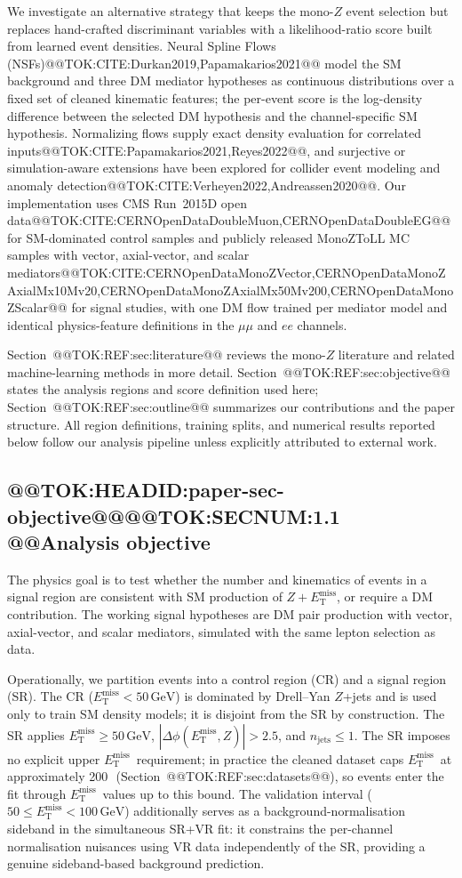 \documentclass[11pt]{article}
\newcommand{\GeV}{\text{GeV}}
\newcommand{\MET}{\ensuremath{E_{\mathrm{T}}^{\mathrm{miss}}}}
\begin{document}
We investigate an alternative strategy that keeps the mono-$Z$ event selection but replaces
hand-crafted discriminant variables with a likelihood-ratio score built from learned event
densities.
Neural Spline Flows (NSFs)@@TOK:CITE:Durkan2019,Papamakarios2021@@ model the SM background and
three DM mediator hypotheses as continuous distributions over a fixed set of cleaned
kinematic features; the per-event score is the log-density difference between the selected
DM hypothesis and the channel-specific SM hypothesis.
Normalizing flows supply exact density evaluation for correlated inputs@@TOK:CITE:Papamakarios2021,Reyes2022@@,
and surjective or simulation-aware extensions have been explored for collider event
modeling and anomaly detection@@TOK:CITE:Verheyen2022,Andreassen2020@@.
Our implementation uses CMS Run~2015D open data@@TOK:CITE:CERNOpenDataDoubleMuon,CERNOpenDataDoubleEG@@
for SM-dominated control samples and publicly released MonoZToLL MC samples with
vector, axial-vector, and scalar mediators@@TOK:CITE:CERNOpenDataMonoZVector,CERNOpenDataMonoZAxialMx10Mv20,CERNOpenDataMonoZAxialMx50Mv200,CERNOpenDataMonoZScalar@@
for signal studies, with one DM flow trained per mediator model and identical
physics-feature definitions in the $\mu\mu$ and $ee$ channels.

Section~@@TOK:REF:sec:literature@@ reviews the mono-$Z$ literature and related machine-learning
methods in more detail.
Section~@@TOK:REF:sec:objective@@ states the analysis regions and score definition used here;
Section~@@TOK:REF:sec:outline@@ summarizes our contributions and the paper structure.
All region definitions, training splits, and numerical results reported below follow our
analysis pipeline unless explicitly attributed to external work.

\subsection{@@TOK:HEADID:paper-sec-objective@@@@TOK:SECNUM:1.1 @@Analysis objective}

The physics goal is to test whether the number and kinematics of events in a signal region
are consistent with SM production of $Z+\MET$, or require a DM contribution.
The working signal hypotheses are DM pair production with vector, axial-vector, and
scalar mediators, simulated with the same lepton selection as data.

Operationally, we partition events into a control region (CR) and a signal region (SR).
The CR ($\MET<50\,\GeV$) is dominated by Drell--Yan $Z$+jets and is used only to train
SM density models; it is disjoint from the SR by construction.
The SR applies $\MET\ge 50\,\GeV$, $|\Delta\phi(\MET,Z)|>2.5$, and $n_{\mathrm{jets}}\le 1$.
The SR imposes no explicit upper \MET\ requirement; in practice the
cleaned dataset caps \MET\ at approximately 200\,\GeV\
(Section~@@TOK:REF:sec:datasets@@), so events enter the fit through \MET\
values up to this bound. The validation interval ($50\le\MET<100\,\GeV$) additionally serves as a
background-normalisation sideband in the simultaneous SR+VR fit: it constrains the per-channel normalisation nuisances using VR data independently of the SR, providing a genuine sideband-based background prediction.
\end{document}
